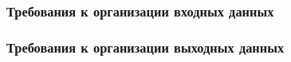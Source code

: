 

\subsubsection{Требования к организации входных данных}

\subsubsection{Требования к организации выходных данных}

